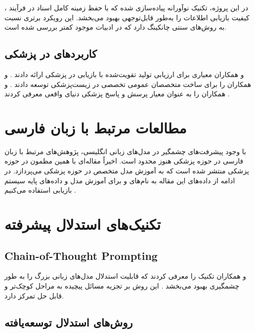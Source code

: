 \documentclass[11pt, a4paper, oneside]{book}
\begin{document}
	در این پروژه، تکنیک نوآورانه  پیاده‌سازی شده که با حفظ زمینه کامل اسناد در فرآیند ، کیفیت بازیابی اطلاعات را به‌طور قابل‌توجهی بهبود می‌بخشد. این رویکرد برتری نسبت به روش‌های سنتی چانکینگ دارد که در ادبیات موجود کمتر بررسی شده است.

	\subsection{کاربردهای  در پزشکی}

	 و همکاران معیاری برای ارزیابی تولید تقویت‌شده با بازیابی در پزشکی ارائه دادند \cite{xiong_benchmarking_2024}.  و همکاران  را برای ساخت متخصصان عمومی تخصصی در زیست‌پزشکی توسعه دادند \cite{xiong_benchmarking_2024}.  و همکاران  را به عنوان معیار پرسش و پاسخ پزشکی دنیای واقعی معرفی کردند \cite{manes_k-qa_2024}.

	\section{مطالعات مرتبط با زبان فارسی}

	با وجود پیشرفت‌های چشمگیر در مدل‌های زبانی انگلیسی، پژوهش‌های مرتبط با زبان فارسی در حوزه پزشکی هنوز محدود است. اخیراً مقاله‌ای با همین مظمون در حوزه پزشکی منتشر شده است که به آموزش  مدل متخصص در حوزه پزشکی می‌پردازد. در ادامه از داده‌های این مقاله به نام‌های  و  برای آموزش مدل و داده‌های پایه سیستم بازیابی استفاده می‌کنیم \cite{ghassabi_leveraging_2025}.

	\section{تکنیک‌های استدلال پیشرفته}
	
	\subsection{Chain-of-Thought Prompting}
	
	 و همکاران تکنیک  را معرفی کردند که قابلیت استدلال مدل‌های زبانی بزرگ را به طور چشمگیری بهبود می‌بخشد \cite{wei_chain--thought_2023}. این روش بر تجزیه مسائل پیچیده به مراحل کوچک‌تر و قابل حل تمرکز دارد.
	
	\subsection{روش‌های استدلال توسعه‌یافته}
	
\end{document}
